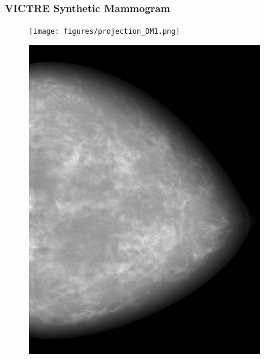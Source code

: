 \documentclass[12pt]{beamer}
\begin{document}
\begin{frame}
\frametitle{VICTRE Synthetic Mammogram}
\begin{figure}[h!]
\centering
\begin{minipage}{0.48\textwidth}
    \centering
    \texttt{[image: figures/projection\_DM1.png]}
\end{minipage}
\hfill
\begin{minipage}{0.48\textwidth}
    \centering
    \includegraphics[width=\textwidth]{figures/for_presentation.png}
\end{minipage}
\end{figure}
\end{frame}
\end{document}
